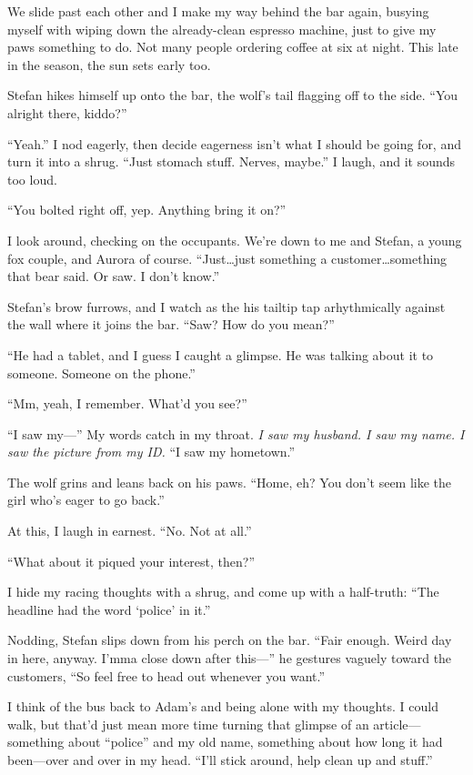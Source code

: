 We slide past each other and I make my way behind the bar again, busying myself with wiping down the already-clean espresso machine, just to give my paws something to do. Not many people ordering coffee at six at night. This late in the season, the sun sets early too.

Stefan hikes himself up onto the bar, the wolf's tail flagging off to the side. ``You alright there, kiddo?''

``Yeah.'' I nod eagerly, then decide eagerness isn't what I should be going for, and turn it into a shrug. ``Just stomach stuff. Nerves, maybe.'' I laugh, and it sounds too loud.

``You bolted right off, yep. Anything bring it on?''

I look around, checking on the occupants. We're down to me and Stefan, a young fox couple, and Aurora of course. ``Just\ldots{}just something a customer\ldots{}something that bear said. Or saw. I don't know.''

Stefan's brow furrows, and I watch as the his tailtip tap arhythmically against the wall where it joins the bar. ``Saw? How do you mean?''

``He had a tablet, and I guess I caught a glimpse. He was talking about it to someone. Someone on the phone.''

``Mm, yeah, I remember. What'd you see?''

``I saw my---'' My words catch in my throat. \emph{I saw my husband. I saw my name. I saw the picture from my ID.} ``I saw my hometown.''

The wolf grins and leans back on his paws. ``Home, eh? You don't seem like the girl who's eager to go back.''

At this, I laugh in earnest. ``No. Not at all.''

``What about it piqued your interest, then?''

I hide my racing thoughts with a shrug, and come up with a half-truth: ``The headline had the word `police' in it.''

Nodding, Stefan slips down from his perch on the bar. ``Fair enough. Weird day in here, anyway. I'mma close down after this---'' he gestures vaguely toward the customers, ``So feel free to head out whenever you want.''

I think of the bus back to Adam's and being alone with my thoughts. I could walk, but that'd just mean more time turning that glimpse of an article---something about ``police'' and my old name, something about how long it had been---over and over in my head. ``I'll stick around, help clean up and stuff.''


